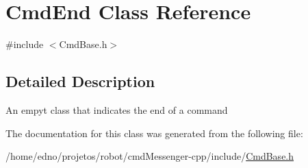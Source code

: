 \hypertarget{class_cmd_end}{\section{Cmd\+End Class Reference}
\label{class_cmd_end}
}


{\ttfamily \#include $<$Cmd\+Base.\+h$>$}



\subsection{Detailed Description}
An empyt class that indicates the end of a command 

The documentation for this class was generated from the following file\+:\begin{DoxyCompactItemize}
\item 
/home/edno/projetos/robot/cmd\+Messenger-\/cpp/include/\hyperlink{_cmd_base_8h}{Cmd\+Base.\+h}\end{DoxyCompactItemize}
